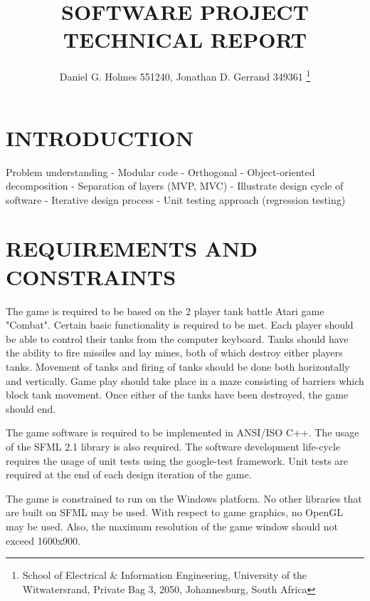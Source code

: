 \documentclass[10pt,twocolumn]{witseiepaper}
\begin{document}
\title{SOFTWARE PROJECT TECHNICAL REPORT}

\author{Daniel G. Holmes 551240, Jonathan D. Gerrand 349361
\thanks{School of Electrical \& Information Engineering, University of the
Witwatersrand, Private Bag 3, 2050, Johannesburg, South Africa}
}

%



\maketitle
\thispagestyle{empty}\pagestyle{empty}


%
\section{INTRODUCTION}%
Problem understanding
- Modular code
- Orthogonal
- Object-oriented decomposition
- Separation of layers (MVP, MVC)
- Illustrate design cycle of software
- Iterative design process
- Unit testing approach (regression testing)

%
\section{REQUIREMENTS AND CONSTRAINTS}%
The game is required to be based on the 2 player tank battle Atari game "Combat". Certain basic functionality is required to be met. Each player should be able to control their tanks from the computer keyboard. Tanks should have the ability to fire missiles and lay mines, both of which destroy either players tanks. Movement of tanks and firing of tanks should be done both horizontally and vertically. Game play should take place in a maze consisting of barriers which block tank movement. Once either of the tanks have been destroyed, the game should end.

The game software is required to be implemented in ANSI/ISO C++. The usage of the SFML 2.1 library is also required. The software development life-cycle requires the usage of unit tests using the google-test framework. Unit tests are required at the end of each design iteration of the game.

The game is constrained to run on the Windows platform. No other libraries that are built on SFML may be used. With respect to game graphics, no OpenGL may be used. Also, the maximum resolution of the game window should not exceed 1600x900. 
\end{document}
